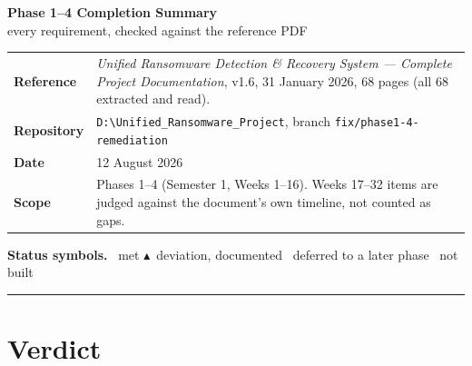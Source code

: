 \documentclass[11pt,a4paper]{article}
\newcommand{\ok}{\textcolor{okgreen}{\ding{51}}}
\newcommand{\no}{\textcolor{nored}{\ding{55}}}
\newcommand{\warn}{\textcolor{warnamber}{$\blacktriangle$}}
\newcommand{\defer}{\textcolor{deferblue}{\textbf{\textbardbl}}}
\begin{document}
\begin{center}
  {\LARGE\bfseries Phase 1--4 Completion Summary}\\[4pt]
  {\large every requirement, checked against the reference PDF}
\end{center}

\vspace{0.8em}

\noindent
\begin{tabularx}{\linewidth}{@{}P{2.4cm}L@{}}
\toprule
\textbf{Reference}  & \emph{Unified Ransomware Detection \& Recovery System --- Complete Project
                      Documentation}, v1.6, 31 January 2026, 68 pages (all 68 extracted and read). \\
\textbf{Repository} & \texttt{D:\textbackslash{}Unified\_Ransomware\_Project}, branch
                      \texttt{fix/phase1-4-remediation} \\
\textbf{Date}       & 12 August 2026 \\
\textbf{Scope}      & Phases 1--4 (Semester 1, Weeks 1--16). Weeks 17--32 items are judged
                      against the document's own timeline, not counted as gaps. \\
\bottomrule
\end{tabularx}

\vspace{1.0em}

\noindent\textbf{Status symbols.}\quad
\ok\ met \quad\textbullet\quad
\warn\ deviation, documented \quad\textbullet\quad
\defer\ deferred to a later phase \quad\textbullet\quad
\no\ not built

\vspace{1.2em}
\hrule height 0.4pt
\vspace{0.6em}

\tableofcontents

\clearpage

\setcounter{section}{-1}
\section{Verdict}
\end{document}

